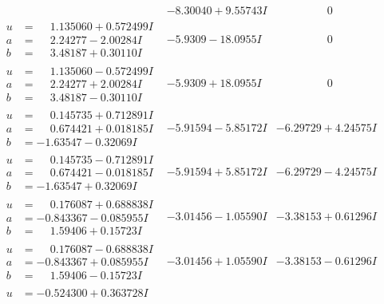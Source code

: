 \documentclass[1p]{elsarticle_modified}
\theoremstyle{definition}
\begin{document}
$$\begin{array}{c|c|c}
 & -8.30040 + 9.55743 I & \phantom{-0.000000 } 0 \\ \hline\begin{aligned}
u &= \phantom{-}1.135060 + 0.572499 I \\
a &= \phantom{-}2.24277 - 2.00284 I \\
b &= \phantom{-}3.48187 + 0.30110 I\end{aligned}
 & -5.9309 - 18.0955 I & \phantom{-0.000000 } 0 \\ \hline\begin{aligned}
u &= \phantom{-}1.135060 - 0.572499 I \\
a &= \phantom{-}2.24277 + 2.00284 I \\
b &= \phantom{-}3.48187 - 0.30110 I\end{aligned}
 & -5.9309 + 18.0955 I & \phantom{-0.000000 } 0 \\ \hline\begin{aligned}
u &= \phantom{-}0.145735 + 0.712891 I \\
a &= \phantom{-}0.674421 + 0.018185 I \\
b &= -1.63547 - 0.32069 I\end{aligned}
 & -5.91594 - 5.85172 I & -6.29729 + 4.24575 I \\ \hline\begin{aligned}
u &= \phantom{-}0.145735 - 0.712891 I \\
a &= \phantom{-}0.674421 - 0.018185 I \\
b &= -1.63547 + 0.32069 I\end{aligned}
 & -5.91594 + 5.85172 I & -6.29729 - 4.24575 I \\ \hline\begin{aligned}
u &= \phantom{-}0.176087 + 0.688838 I \\
a &= -0.843367 - 0.085955 I \\
b &= \phantom{-}1.59406 + 0.15723 I\end{aligned}
 & -3.01456 - 1.05590 I & -3.38153 + 0.61296 I \\ \hline\begin{aligned}
u &= \phantom{-}0.176087 - 0.688838 I \\
a &= -0.843367 + 0.085955 I \\
b &= \phantom{-}1.59406 - 0.15723 I\end{aligned}
 & -3.01456 + 1.05590 I & -3.38153 - 0.61296 I \\ \hline\begin{aligned}
u &= -0.524300 + 0.363728 I \\

\end{aligned}
\end{array}$$
\end{document}
